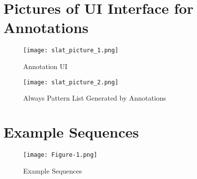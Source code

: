 \documentclass[pmlr,twocolumn,10pt]{jmlr} %
\begin{document}
\section{Pictures of UI Interface for Annotations} 
\label{app:slat}
\begin{figure}[h]
\centering 
\texttt{[image: slat\_picture\_1.png]}
\caption{Annotation UI}
\end{figure}

\begin{figure}[h]
\centering 
\texttt{[image: slat\_picture\_2.png]}
\caption{Always Pattern List Generated by Annotations}
\end{figure}

\clearpage

\section{Example Sequences} 
\begin{figure}[h!] \label{app:examples}
\centering 
\texttt{[image: Figure-1.png]}
\caption{Example Sequences}
\end{figure}

\clearpage

\end{document}
